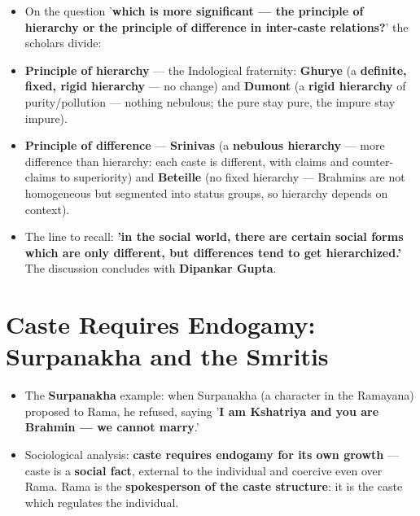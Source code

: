 \begin{KeyConcept}
\begin{itemize}
\item On the question '\textbf{which is more significant --- the principle of hierarchy or the principle of difference in inter-caste relations?}' the scholars divide:
\item \textbf{Principle of hierarchy} --- the Indological fraternity: \textbf{Ghurye} (a \textbf{definite, fixed, rigid hierarchy} --- no change) and \textbf{Dumont} (a \textbf{rigid hierarchy} of purity/pollution --- nothing nebulous; the pure stay pure, the impure stay impure).
\item \textbf{Principle of difference} --- \textbf{Srinivas} (a \textbf{nebulous hierarchy} --- more difference than hierarchy: each caste is different, with claims and counter-claims to superiority) and \textbf{Beteille} (no fixed hierarchy --- Brahmins are not homogeneous but segmented into status groups, so hierarchy depends on context).
\item The line to recall: \textbf{'in the social world, there are certain social forms which are only different, but differences tend to get hierarchized.'} The discussion concludes with \textbf{Dipankar Gupta}.
\end{itemize}
\end{KeyConcept}

\section{Caste Requires Endogamy: Surpanakha and the Smritis}

\begin{ExampleBox}
\begin{itemize}
\item The \textbf{Surpanakha} example: when Surpanakha (a character in the Ramayana) proposed to Rama, he refused, saying '\textbf{I am Kshatriya and you are Brahmin --- we cannot marry}.'
\item Sociological analysis: \textbf{caste requires endogamy for its own growth} --- caste is a \textbf{social fact}, external to the individual and coercive even over Rama. Rama is the \textbf{spokesperson of the caste structure}: it is the caste which regulates the individual.
\end{itemize}
\end{ExampleBox}

